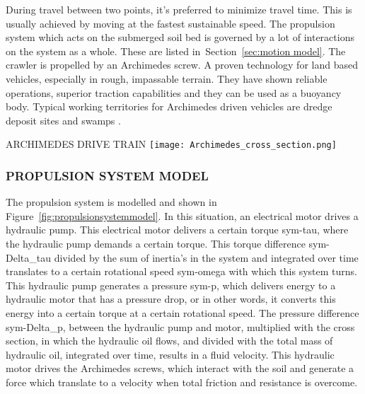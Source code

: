 During travel between two points, it's preferred to minimize travel time. This is usually achieved by moving at the 
fastest sustainable speed. The propulsion system which acts on the submerged soil bed is governed by a lot of 
interactions on the system as a whole. These are listed in~Section~\ref{sec:motion model}. The crawler is propelled 
by an Archimedes screw. A proven technology for land based vehicles, especially in rough, impassable terrain. They 
have shown reliable operations, superior traction capabilities and they can be used as a buoyancy body. Typical 
working territories for Archimedes driven vehicles are dredge deposit sites and swamps \cite{lotman_deep_2011}.

\begin{RoyalFigure}[!htb, label=fig:archimedes_drive_train]{ARCHIMEDES DRIVE TRAIN}
    \texttt{[image: Archimedes\_cross\_section.png]}
\end{RoyalFigure}

\subsubsection{PROPULSION SYSTEM MODEL}

The propulsion system is modelled and shown in Figure~\ref{fig:propulsionsystemmodel}. In this situation, an
electrical motor drives a hydraulic pump. This electrical motor delivers a certain torque \gls{sym-tau}, where the
hydraulic pump demands a certain torque. This torque difference \gls{sym-Delta_tau} divided by the sum of inertia's 
in the system
and
integrated over time translates to a certain rotational speed \gls{sym-omega} with which this system turns. This
hydraulic pump generates a pressure \gls{sym-p}, which delivers energy to a hydraulic motor that has a pressure drop,
or in other words, it converts this energy into a certain torque at a certain rotational speed. The pressure difference
\gls{sym-Delta_p}, between the hydraulic pump and motor, multiplied with the cross section, in which the hydraulic oil
flows, and divided with the total mass of hydraulic oil, integrated over time, results in a fluid velocity. This
hydraulic motor drives the Archimedes screws, which interact with the soil and generate a force which translate to a 
velocity when total friction and resistance is overcome.

